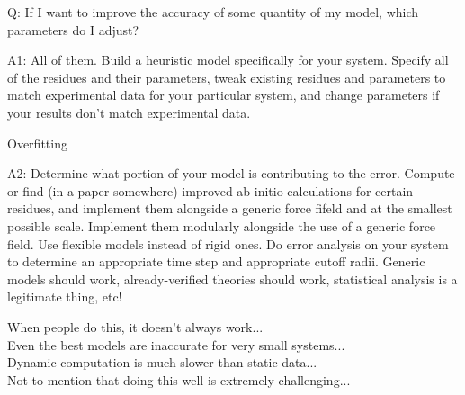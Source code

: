 \documentclass{beamer}
\begin{document}

\begin{frame}
Q: If I want to improve the accuracy of some quantity of my model, which
parameters do I adjust?
\end{frame}


\begin{frame}
A1: All of them. Build a heuristic model specifically for your system. Specify
all of the residues and their parameters, tweak existing residues and parameters
to match experimental data for your particular system, and change parameters if
your results don't match experimental data.
\end{frame}


\begin{frame}
    \Huge{Overfitting}
\end{frame}


\begin{frame}
A2: Determine what portion of your model is contributing to the error. Compute
or find (in a paper somewhere) improved ab-initio calculations for certain
residues, and implement them alongside a generic force fifeld and at the
smallest possible scale. Implement them modularly alongside the use of a generic
force field. Use flexible models instead of rigid ones. Do error analysis on
your system to determine an appropriate time step and appropriate cutoff radii.
Generic models should work, already-verified theories should work, statistical
analysis is a legitimate thing, etc!
\end{frame}


\begin{frame}
When people do this, it doesn't always work...\\[\baselineskip]
Even the best models are inaccurate for very small systems...\\[\baselineskip]
Dynamic computation is much slower than static data...\\[\baselineskip]
Not to mention that doing this well is extremely challenging...\\[\baselineskip]
\end{frame}

\end{document}

